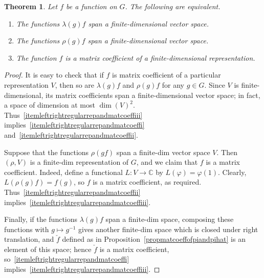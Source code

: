 \documentclass[12pt,reqno]{book}%
\newtheorem{theorem}{Theorem}[chapter]
\theoremstyle{definition}
\theoremstyle{remark}
\theoremstyle{theorem}
\theoremstyle{remark}
\begin{document}
\begin{theorem}\label{thmleftrightregularrepandmatcoeff}%
    Let $f$ be a function on $G$.
    The following are equivalent.
    \begin{enumerate}[label= (\roman*),font=\normalfont,before=\normalfont]
        \item The functions $\lambda(g)f$ span a finite-dimensional vector space.\label{itemleftrightregularrepandmatcoeffi}
        \item The functions $\rho(g)f$ span a finite-dimensional vector space.\label{itemleftrightregularrepandmatcoeffii}
        \item The function $f$ is a matrix coefficient of a finite-dimensional representation.\label{itemleftrightregularrepandmatcoeffiii}
    \end{enumerate}
\end{theorem}%
\begin{proof}%
    It is easy to check that if $f$ is matrix coefficient of a particular representation $V$, then so are $\lambda(g)f$ and $\rho(g)f$ for any $g \in G$.
    Since $V$ is finite-dimensional, its matrix coefficients span a finite-dimensional vector space; in fact, a space of dimension at most ${\dim(V)}^{2}$.
    Thus~\ref{itemleftrightregularrepandmatcoeffiii} implies~\ref{itemleftrightregularrepandmatcoeffi} and~\ref{itemleftrightregularrepandmatcoeffii}.

    Suppose that the functions $\rho(gf)$ span a finite-dim vector space $V$.
    Then $(\rho, V)$ is a finite-dim representation of $G$, and we claim that $f$ is a matrix coefficient.
    Indeed, define a functional $L : V \to \mathbb{C}$ by $L(\varphi) = \varphi(1)$.
    Clearly, $L(\rho(g)f) = f(g)$, so $f$ is a matrix coefficient, as required.
    Thus~\ref{itemleftrightregularrepandmatcoeffii} implies~\ref{itemleftrightregularrepandmatcoeffiii}.

    Finally, if the functions $\lambda(g)f$ span a finite-dim space, composing these functions with $g \mapsto g^{-1}$ gives another finite-dim space which is closed under right translation, and $\check{f}$ defined as in Proposition~\ref{propmatcoeffofpiandpihat} is an element of this space; hence $\check{f}$ is a matrix coefficient, so~\ref{itemleftrightregularrepandmatcoeffi} implies~\ref{itemleftrightregularrepandmatcoeffiii}.
\end{proof}%
\end{document}
